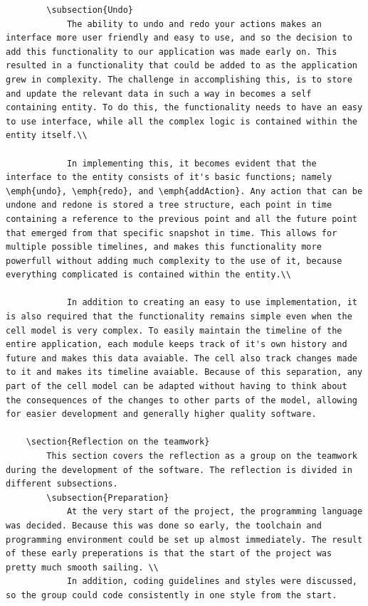 \documentclass[10pt,a4paper]{report}
\begin{document}
\begin{lstlisting}
		\subsection{Undo}
			The ability to undo and redo your actions makes an interface more user friendly and easy to use, and so the decision to add this functionality to our application was made early on. This resulted in a functionality that could be added to as the application grew in complexity. The challenge in accomplishing this, is to store and update the relevant data in such a way in becomes a self containing entity. To do this, the functionality needs to have an easy to use interface, while all the complex logic is contained within the entity itself.\\
			
			In implementing this, it becomes evident that the interface to the entity consists of it's basic functions; namely \emph{undo}, \emph{redo}, and \emph{addAction}. Any action that can be undone and redone is stored a tree structure, each point in time containing a reference to the previous point and all the future point that emerged from that specific snapshot in time. This allows for multiple possible timelines, and makes this functionality more powerfull without adding much complexity to the use of it, because everything complicated is contained within the entity.\\

			In addition to creating an easy to use implementation, it is also required that the functionality remains simple even when the cell model is very complex. To easily maintain the timeline of the entire application, each module keeps track of it's own history and future and makes this data avaiable. The cell also track changes made to it and makes its timeline avaiable. Because of this separation, any part of the cell model can be adapted without having to think about the consequences of the changes to other parts of the model, allowing for easier development and generally higher quality software.
	
	\section{Reflection on the teamwork}
		This section covers the reflection as a group on the teamwork during the development of the software. The reflection is divided in different subsections.
		\subsection{Preparation}
			At the very start of the project, the programming language was decided. Because this was done so early, the toolchain and programming environment could be set up almost immediately. The result of these early preperations is that the start of the project was pretty much smooth sailing. \\
			In addition, coding guidelines and styles were discussed, so the group could code consistently in one style from the start.
		

\end{lstlisting}
\end{document}

